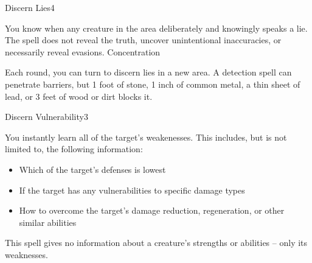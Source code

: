 \begin{spellsection}{Discern Lies}{4}
\begin{spellheader}
\end{spellheader}
\begin{spellcontent}
    \begin{spelltargetinginfo}
    \end{spelltargetinginfo}
    \begin{spelleffects}
        \spelleffect You know when any creature in the area deliberately and knowingly speaks a lie. The spell does not reveal the truth, uncover unintentional inaccuracies, or necessarily reveal evasions.
        \spelldur Concentration
    \end{spelleffects}
\end{spellcontent}
\begin{spellfooter}
    \spellnotes Each round, you can turn to discern lies in a new area. A detection spell can penetrate barriers, but 1 foot of stone, 1 inch of common metal, a thin sheet of lead, or 3 feet of wood or dirt blocks it.
\end{spellfooter}
\end{spellsection}

\begin{spellsection}{Discern Vulnerability}{3}
\begin{spellheader}
    \spellrng{\rngmed}
\end{spellheader}
\begin{spellcontent}
    \begin{spelltargetinginfo}
    \end{spelltargetinginfo}
    \begin{spelleffects}
        \spelleffect You instantly learn all of the target's weakenesses. This includes, but is not limited to, the following information:
        \begin{itemize}
            \item Which of the target's defenses is lowest
            \item If the target has any vulnerabilities to specific damage types
            \item How to overcome the target's damage reduction, regeneration, or other similar abilities
        \end{itemize}
        \spelldur \durshort
    \end{spelleffects}
\end{spellcontent}
\begin{spellfooter}
    \spellnotes This spell gives no information about a creature's strengths or abilities -- only its weaknesses.
\end{spellfooter}
\end{spellsection}

